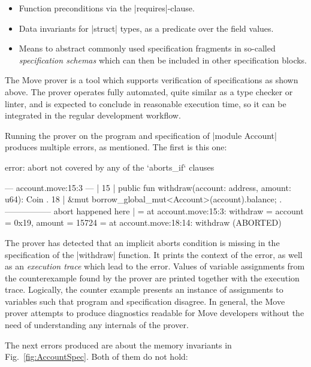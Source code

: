 \begin{itemize}
\item Function preconditions via the |requires|-clause.
\item Data invariants for |struct| types, as a predicate over the field values.
\item Means to abstract commonly used specification fragments in so-called
  \emph{specification schemas} which can then be included in other specification
  blocks.
\end{itemize}

\label{sec:RunningProver}

The Move prover is a tool which supports verification of specifications as shown
above. The prover operates fully automated, quite similar as a type checker or
linter, and is expected to conclude in reasonable execution time, so it can be
integrated in the regular development workflow.

Running the prover on the program and specification of |module Account| produces
multiple errors, as mentioned. The first is this one:


\begin{MoveDiag}
error: abort not covered by any of the `aborts_if` clauses

    --- account.move:15:3 ---
    |
 15 |  public fun withdraw(account: address, amount: u64): Coin
    .
 18 |         &mut borrow_global_mut<Account>(account).balance;
    .              ----------------- abort happened here
    |
    =     at account.move:15:3: withdraw
    =         account = 0x19, amount = 15724
    =     at account.move:18:14: withdraw (ABORTED)
\end{MoveDiag}

\noindent The prover has detected that an implicit aborts condition is missing
in the specification of the |withdraw| function. It prints the context of the
error, as well as an \emph{execution trace} which lead to the error. Values of
variable assignments from the counterexample found by the prover are printed
together with the execution trace. Logically, the counter example presents an
instance of assignments to variables such that program and specification
disagree. In general, the Move prover attempts to produce diagnostics readable
for Move developers without the need of understanding any internals of the
prover.


The next errors produced are about the memory invariants in
Fig.~\ref{fig:AccountSpec}. Both of them do not hold:

